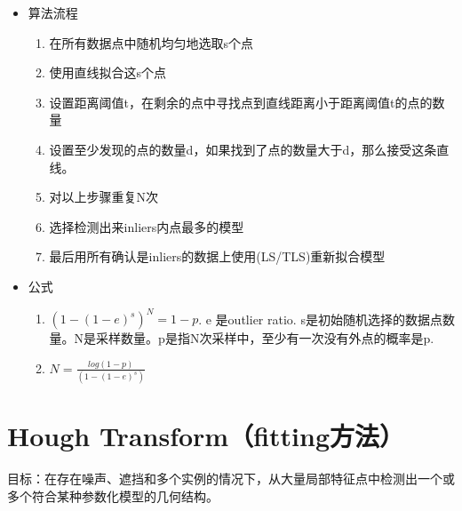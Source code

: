\documentclass[UTF8]{ctexart}
\begin{document}
\begin{itemize}
    \item 算法流程
    \begin{enumerate}
        \item 在所有数据点中随机均匀地选取s个点
        \item 使用直线拟合这s个点
        \item 设置距离阈值t，在剩余的点中寻找点到直线距离小于距离阈值t的点的数量
        \item 设置至少发现的点的数量d，如果找到了点的数量大于d，那么接受这条直线。
        \item 对以上步骤重复N次
        \item 选择检测出来inliers内点最多的模型
        \item 最后用所有确认是inliers的数据上使用(LS/TLS)重新拟合模型
    \end{enumerate}
    \item 公式
    \begin{enumerate}
        \item $(1-(1-e)^s)^N=1-p$. e 是outlier ratio. s是初始随机选择的数据点数量。N是采样数量。p是指N次采样中，至少有一次没有外点的概率是p.
        \item $N=\frac{log(1-p)}{(1-(1-e)^s)}$
    \end{enumerate}
\end{itemize}


\section{Hough Transform（fitting方法）}

目标：在存在噪声、遮挡和多个实例的情况下，从大量局部特征点中检测出一个或多个符合某种参数化模型的几何结构。
\end{document}

